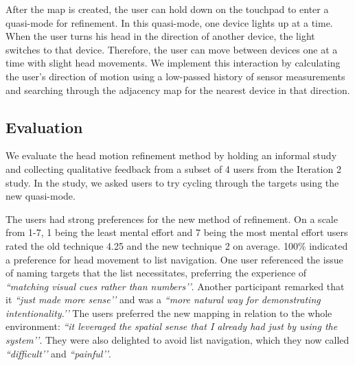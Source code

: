 After the map is created, the user can hold down on the touchpad to enter a
quasi-mode for refinement. In this quasi-mode, one device lights up at a time. When the user turns his head in the direction of another device, the light switches to that device. Therefore, the user can move between devices one at a time with slight head movements. We implement this interaction by calculating the user's direction of motion using a low-passed history of sensor measurements and searching through the adjacency map for
the nearest device in that direction. 

\subsection{Evaluation}
We evaluate the head motion refinement method by holding an informal study and collecting qualitative feedback from a subset of 4 users from the Iteration 2 study. In the study, we asked users to try cycling through the targets using the new quasi-mode.

The users had strong preferences for the new method of refinement. On a scale from 1-7, 1 being the least mental effort and 7 being the most mental effort users rated the old technique 4.25 and the new technique 2 on average. 100\% indicated a preference for head movement to list navigation. One user referenced the issue of naming targets that the list necessitates, preferring the experience of {\em ``matching visual cues rather than numbers’’}. Another participant remarked that it {\em ``just made more sense’’} and was a {\em``more natural way for demonstrating intentionality.’’} The users preferred the new mapping in relation to the whole environment: {\em ``it leveraged the spatial sense that I already had just by using the system’’}. They were also delighted to avoid list navigation, which they now called {\em ``difficult’’} and {\em ``painful’’}. 
